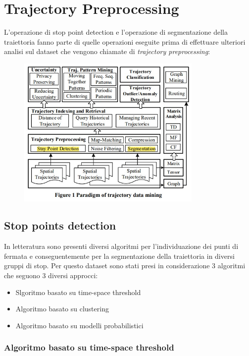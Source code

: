 \documentclass[12pt]{article}
\begin{document}
\section{Trajectory Preprocessing}
L'operazione di stop point detection e l'operazione di segmentazione della traiettoria fanno parte di quelle operazioni eseguite prima di effettuare ulteriori analisi sul dataset che vengono chiamate di \textit{trajectory preprocessing}:
\begin{figure}[htb!]
    \centering
    \includegraphics[width=0.8\textwidth]{images/spd.jpg}
\end{figure}
\FloatBarrier
\subsection{Stop points detection}
In letteratura sono presenti diversi algoritmi per l'individuazione dei punti di fermata e conseguentemente per la segmentazione della traiettoria in diversi gruppi di stop. Per questo dataset sono stati presi in considerazione 3 algoritmi che seguono 3 diversi approcci:
\begin{itemize}
    \item Slgoritmo basato su time-space threshold
    \item Algoritmo basato su clustering
    \item Algoritmo basato su modelli probabilistici
\end{itemize}
\subsubsection{Algoritmo basato su time-space threshold}
\end{document}
